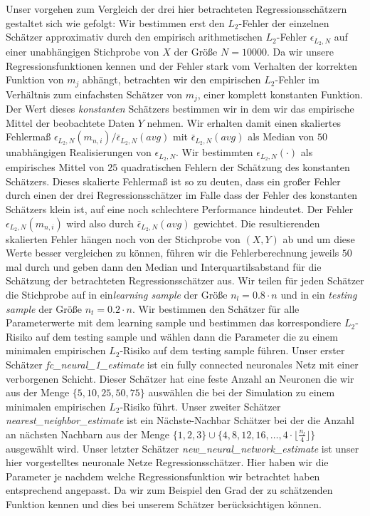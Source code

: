 Unser vorgehen zum Vergleich der drei hier betrachteten Regressionsschätzern gestaltet sich wie gefolgt:
Wir bestimmen erst den $L_2$-Fehler der einzelnen Schätzer approximativ durch den empirisch arithmetischen $L_2$-Fehler $\epsilon_{L_2,N}$ auf einer unabhängigen Stichprobe von $X$ der Größe $N = 10000$. Da wir unsere Regressionsfunktionen kennen und der Fehler stark vom Verhalten der korrekten Funktion von $m_j$ abhängt, betrachten wir den empirischen $L_2$-Fehler im Verhältnis zum einfachsten Schätzer von $m_j$, einer komplett konstanten Funktion. Der Wert dieses \textit{konstanten} Schätzers bestimmen wir in dem wir das empirische Mittel der beobachtete Daten $Y$ nehmen. Wir erhalten damit einen skaliertes Fehlermaß $\epsilon_{L_2,N}(m_{n,i})/\bar{\epsilon}_{L_2,N}(avg)$ mit $\bar{\epsilon}_{L_2,N}(avg)$ als Median von $50$ unabhängigen Realisierungen von $\epsilon_{L_2,N}$. Wir bestimmten $\epsilon_{L_2,N}(\cdot)$ als empirisches Mittel von $25$ quadratischen Fehlern der Schätzung des konstanten Schätzers. Dieses skalierte Fehlermaß ist so zu deuten, dass ein großer Fehler durch einen der drei Regressionsschätzer im Falle dass der Fehler des konstanten Schätzers klein ist, auf eine noch schlechtere Performance hindeutet. Der Fehler $\epsilon_{L_2,N}(m_{n,i})$ wird also durch $\bar{\epsilon}_{L_2,N}(avg)$ gewichtet.
Die resultierenden skalierten Fehler hängen noch von der Stichprobe von $(X, Y)$ ab und um diese Werte besser vergleichen zu können, führen wir die Fehlerberechnung jeweils $50$ mal durch und geben dann den Median und Interquartilsabstand für die Schätzung der betrachteten Regressionsschätzer aus.
Wir teilen für jeden Schätzer die Stichprobe auf in ein\textit{learning sample} der Größe $n_l = 0.8 \cdot n$ und in ein \textit{testing sample} der Größe $n_t = 0.2 \cdot n$. Wir bestimmen den Schätzer für alle Parameterwerte mit dem learning sample und bestimmen das korrespondiere $L_2$-Risiko auf dem testing sample und wählen dann die Parameter die zu einem minimalen empirischen $L_2$-Risiko auf dem testing sample führen.
Unser erster Schätzer \textit{fc\_neural\_1\_estimate} ist ein fully connected neuronales Netz mit einer verborgenen Schicht. Dieser Schätzer hat eine feste Anzahl an Neuronen die wir aus der Menge $\{5, 10, 25, 50, 75\}$ auswählen die bei der Simulation zu einem minimalen empirischen $L_2$-Risiko führt.
Unser zweiter Schätzer \textit{nearest\_neighbor\_estimate} ist ein Nächste-Nachbar Schätzer bei der die Anzahl an nächsten Nachbarn aus der Menge $\{1, 2, 3\} \cup \{4, 8, 12, 16, \dots, 4 \cdot \lfloor\frac{n_l}{4}\rfloor\}$ ausgewählt wird.
Unser letzter Schätzer \textit{new\_neural\_network\_estimate} ist unser hier vorgestelltes neuronale Netze Regressionsschätzer. Hier haben wir die Parameter je nachdem welche Regressionsfunktion wir betrachtet haben entsprechend angepasst. Da wir zum Beispiel den Grad der zu schätzenden Funktion kennen und dies bei unserem Schätzer berücksichtigen können.

